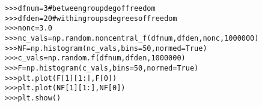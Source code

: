 \begin{boxedminipage}{\funcwidth}
\begin{alltt}
{\textgreater}{\textgreater}{\textgreater} dfnum = 3 \# between group deg of freedom
{\textgreater}{\textgreater}{\textgreater} dfden = 20 \# within groups degrees of freedom
{\textgreater}{\textgreater}{\textgreater} nonc = 3.0
{\textgreater}{\textgreater}{\textgreater} nc\_vals = np.random.noncentral\_f(dfnum, dfden, nonc, 1000000)
{\textgreater}{\textgreater}{\textgreater} NF = np.histogram(nc\_vals, bins=50, normed=True)
{\textgreater}{\textgreater}{\textgreater} c\_vals = np.random.f(dfnum, dfden, 1000000)
{\textgreater}{\textgreater}{\textgreater} F = np.histogram(c\_vals, bins=50, normed=True)
{\textgreater}{\textgreater}{\textgreater} plt.plot(F[1][1:], F[0])
{\textgreater}{\textgreater}{\textgreater} plt.plot(NF[1][1:], NF[0])
{\textgreater}{\textgreater}{\textgreater} plt.show()
\end{alltt}

\setlength{\parskip}{1ex}
    \end{boxedminipage}

    \label{trunk:qstkutil:bollinger:normal}

    \vspace{0.5ex}

